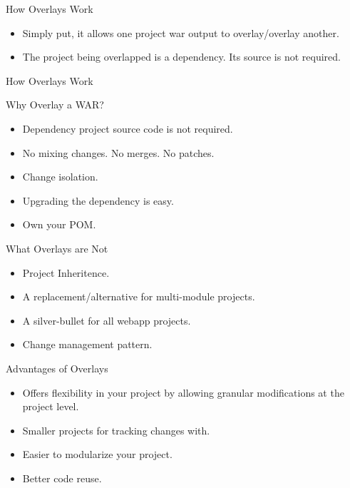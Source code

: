 \documentclass[xcolor=dvipsnames,14pt,professionalfonts]{beamer}
\begin{document}
\begin{frame}{How Overlays Work}
  \begin{itemize}
    \item Simply put, it allows one project war output to
      overlay/overlay another.
    \item The project being overlapped is a dependency. Its source is
      not required.
  \end{itemize}
  \end{frame}
\begin{frame}{How Overlays Work}
\end{frame}

\begin{frame}{Why Overlay a WAR?}
  \begin{itemize}
    \item Dependency project source code is not required.
    \item No mixing changes. No merges. No patches.
    \item Change isolation.
    \item Upgrading the dependency is easy.
    \item Own your POM.
  \end{itemize}
\end{frame}

\begin{frame}{What Overlays are Not}
  \begin{itemize}
  \item Project Inheritence.
  \item A replacement/alternative for multi-module projects.
  \item A silver-bullet for all webapp projects.
  \item Change management pattern.
  \end{itemize}
\end{frame}


\begin{frame}{Advantages of Overlays}
  \begin{itemize}
    \item Offers flexibility in your project by allowing granular
      modifications at the project level.
    \item Smaller projects for tracking changes with.
    \item Easier to modularize your project.
    \item Better code reuse.
  \end{itemize}
\end{frame}
\end{document}
